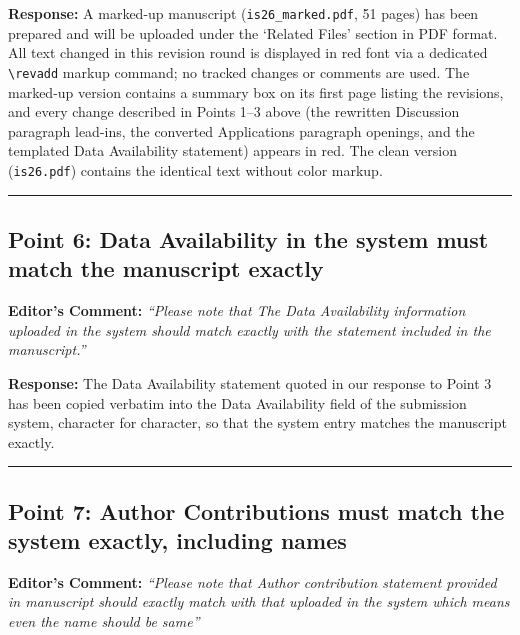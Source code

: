 \documentclass[11pt,a4paper]{article}
\begin{document}
\vspace{0.5em}
\noindent\textbf{Response:}
A marked-up manuscript (\texttt{is26\_marked.pdf}, 51 pages) has been prepared and will be uploaded under the `Related Files' section in PDF format. All text changed in this revision round is displayed in red font via a dedicated \texttt{\textbackslash revadd} markup command; no tracked changes or comments are used. The marked-up version contains a summary box on its first page listing the revisions, and every change described in Points 1--3 above (the rewritten Discussion paragraph lead-ins, the converted Applications paragraph openings, and the templated Data Availability statement) appears in red. The clean version (\texttt{is26.pdf}) contains the identical text without color markup.

\vspace{1.5em}
\hrule
\vspace{1.5em}

\subsection*{Point 6: Data Availability in the system must match the manuscript exactly}

\vspace{0.5em}
\noindent\textbf{Editor's Comment:}
\textit{``Please note that The Data Availability information uploaded in the system should match exactly with the statement included in the manuscript.''}

\vspace{0.5em}
\noindent\textbf{Response:}
The Data Availability statement quoted in our response to Point 3 has been copied verbatim into the Data Availability field of the submission system, character for character, so that the system entry matches the manuscript exactly.

\vspace{1.5em}
\hrule
\vspace{1.5em}

\subsection*{Point 7: Author Contributions must match the system exactly, including names}

\vspace{0.5em}
\noindent\textbf{Editor's Comment:}
\textit{``Please note that Author contribution statement provided in manuscript should exactly match with that uploaded in the system which means even the name should be same''}
\end{document}

